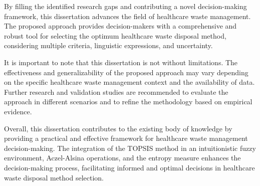 \begin{flushleft}
\vspace{3mm}

By filling the identified research gaps and contributing a novel decision-making framework, this dissertation advances the field of healthcare waste management. The proposed approach provides decision-makers with a comprehensive and robust tool for selecting the optimum healthcare waste disposal method, considering multiple criteria, linguistic expressions, and uncertainty.

\vspace{3mm}

It is important to note that this dissertation is not without limitations. The effectiveness and generalizability of the proposed approach may vary depending on the specific healthcare waste management context and the availability of data. Further research and validation studies are recommended to evaluate the approach in different scenarios and to refine the methodology based on empirical evidence.

\vspace{3mm}

Overall, this dissertation contributes to the existing body of knowledge by providing a practical and effective framework for healthcare waste management decision-making. The integration of the TOPSIS method in an intuitionistic fuzzy environment, Aczel-Alsina operations, and the entropy measure enhances the decision-making process, facilitating informed and optimal decisions in healthcare waste disposal method selection.


\end{flushleft}